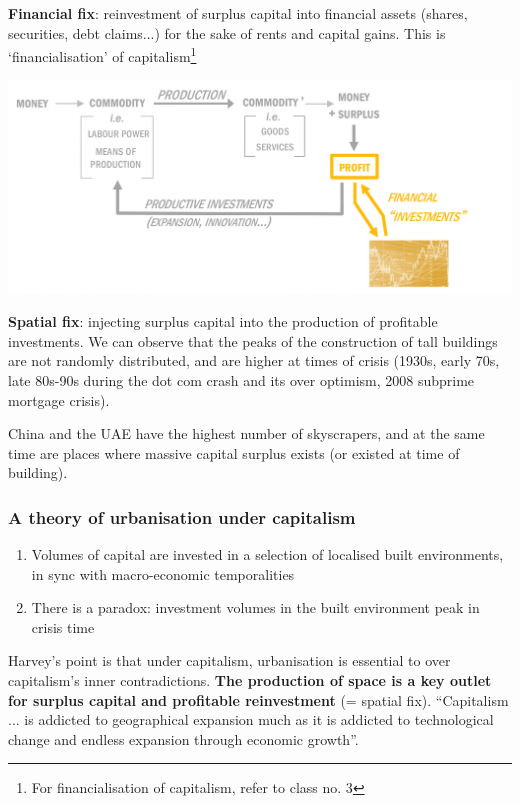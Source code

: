 \documentclass{article}
\begin{document}
\textbf{Financial fix}: reinvestment of surplus capital into financial assets (shares, securities, debt claims...) for the sake of rents and capital gains. This is `financialisation' of capitalism\footnote{For financialisation of capitalism, refer to class no. 3}

\includegraphics[width=\textwidth]{financial_fix}

\textbf{Spatial fix}: injecting surplus capital into the production of profitable investments. We can observe that the peaks of the construction of tall buildings are not randomly distributed, and are higher at times of crisis (1930s, early 70s, late 80s-90s during the dot com crash and its over optimism, 2008 subprime mortgage crisis).

China and the UAE have the highest number of skyscrapers, and at the same time are places where massive capital surplus exists (or existed at time of building).

\subsubsection{A theory of urbanisation under capitalism}

\begin{enumerate}
	\item Volumes of capital are invested in a selection of localised built environments, in sync with macro-economic temporalities
	\item There is a paradox: investment volumes in the built environment peak in crisis time
\end{enumerate}

Harvey's point is that under capitalism, urbanisation is essential to over capitalism's inner contradictions. \textbf{The production of space is a key outlet for surplus capital and profitable reinvestment} (= spatial fix). ``Capitalism ... is addicted to geographical expansion much as it is addicted to technological change and endless expansion through economic growth''.
\end{document}
